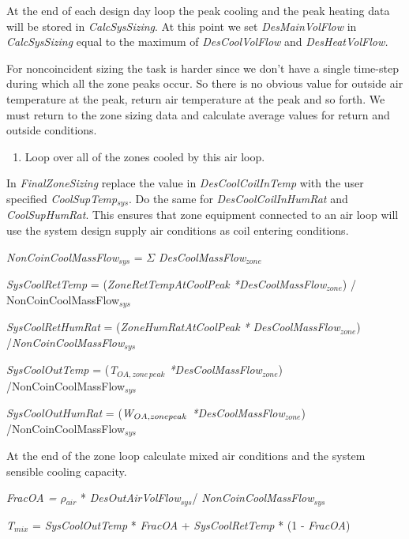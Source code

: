 At the end of each design day loop the peak cooling and the peak heating data will be stored in \emph{CalcSysSizing}. At this point we set \emph{DesMainVolFlow} in \emph{CalcSysSizing} equal to the maximum of \emph{DesCoolVolFlow} and \emph{DesHeatVolFlow.}

For noncoincident sizing the task is harder since we don't have a single time-step during which all the zone peaks occur. So there is no obvious value for outside air temperature at the peak, return air temperature at the peak and so forth. We must return to the zone sizing data and calculate average values for return and outside conditions.

\begin{enumerate}
\def\labelenumi{(\alph{enumi})}
\setcounter{enumi}{1}
\item Loop over all of the zones cooled by this air loop.
\end{enumerate}

In \emph{FinalZoneSizing} replace the value in \emph{DesCoolCoilInTemp} with the user specified \emph{CoolSupTemp\(_{sys}\)}. Do the same for \emph{DesCoolCoilInHumRat} and \emph{CoolSupHumRat}. This ensures that zone equipment connected to an air loop will use the system design supply air conditions as coil entering conditions.

 \emph{NonCoinCoolMassFlow\(_{sys}\)} = $\Sigma$ \emph{DesCoolMassFlow\(_{zone}\)}
  
 \emph{SysCoolRetTemp} = (\emph{ZoneRetTempAtCoolPeak *DesCoolMassFlow\(_{zone}\)}) / {NonCoinCoolMassFlow\(_{sys}\)}
 
 \emph{SysCoolRetHumRat} = (\emph{ZoneHumRatAtCoolPeak *} \emph{DesCoolMassFlow\(_{zone}\)}) /\emph{NonCoinCoolMassFlow\(_{sys}\)}
 
 \emph{SysCoolOutTemp} = (\emph{T\(_{OA,zone\, peak}\) *DesCoolMassFlow\(_{zone}\)}) /NonCoinCoolMassFlow\(_{sys}\)
 
 \emph{SysCoolOutHumRat} = (\emph{W\(_{OA,zone\\ peak}\) *DesCoolMassFlow\(_{zone}\)}) /NonCoinCoolMassFlow\(_{sys}\)

At the end of the zone loop calculate mixed air conditions and the system sensible cooling capacity.

\emph{FracOA = $\rho$\(_{air}\)} * \emph{DesOutAirVolFlow\(_{sys}\)}/ \emph{NonCoinCoolMassFlow\(_{sys}\)}

\emph{T\(_{mix}\)} = \emph{SysCoolOutTemp} * \emph{FracOA} + \emph{SysCoolRetTemp} * (1 - \emph{FracOA})

